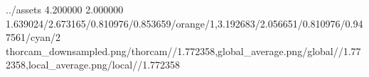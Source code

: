 \TrioComparisonFigure
    {../assets}
    {4.200000}
    {2.000000}
    {1.639024/2.673165/0.810976/0.853659/orange/1,3.192683/2.056651/0.810976/0.947561/cyan/2}
    {thorcam_downsampled.png/thorcam//1.772358,global_average.png/global//1.772358,local_average.png/local//1.772358}

